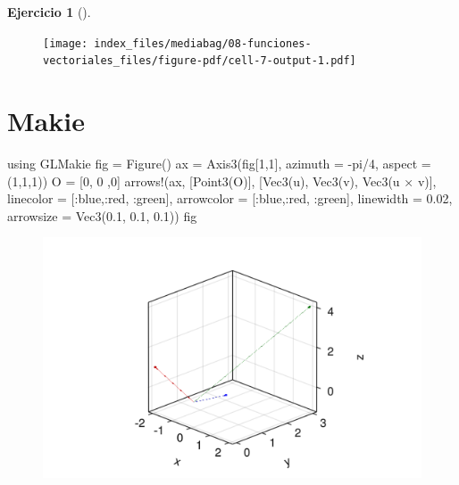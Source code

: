 \documentclass[
  a4paper,
]{scrreport}
\newenvironment{Shaded}{\begin{snugshade}}{\end{snugshade}}
\newcommand{\BuiltInTok}[1]{\textcolor[rgb]{0.00,0.23,0.31}{#1}}
\newcommand{\ConstantTok}[1]{\textcolor[rgb]{0.56,0.35,0.01}{#1}}
\newcommand{\FloatTok}[1]{\textcolor[rgb]{0.68,0.00,0.00}{#1}}
\newcommand{\FunctionTok}[1]{\textcolor[rgb]{0.28,0.35,0.67}{#1}}
\newcommand{\ImportTok}[1]{\textcolor[rgb]{0.00,0.46,0.62}{#1}}
\newcommand{\NormalTok}[1]{\textcolor[rgb]{0.00,0.23,0.31}{#1}}
\newcommand{\OperatorTok}[1]{\textcolor[rgb]{0.37,0.37,0.37}{#1}}
\theoremstyle{definition}
\newtheorem{exercise}{Ejercicio}[chapter]
\theoremstyle{remark}
\begin{document}
\begin{exercise}[]
\begin{enumerate}
\begin{tcolorbox}
  \begin{figure}[H]

  {\centering \texttt{[image: index\_files/mediabag/08-funciones-vectoriales\_files/figure-pdf/cell-7-output-1.pdf]}

  }

  \end{figure}

  \section{Makie}

\begin{Shaded}
\begin{Highlighting}[]
\ImportTok{using} \BuiltInTok{GLMakie}
\NormalTok{fig }\OperatorTok{=} \FunctionTok{Figure}\NormalTok{()}
\NormalTok{ax }\OperatorTok{=} \FunctionTok{Axis3}\NormalTok{(fig[}\FloatTok{1}\NormalTok{,}\FloatTok{1}\NormalTok{], azimuth }\OperatorTok{=} \OperatorTok{{-}}\ConstantTok{pi}\OperatorTok{/}\FloatTok{4}\NormalTok{, aspect }\OperatorTok{=}\NormalTok{ (}\FloatTok{1}\NormalTok{,}\FloatTok{1}\NormalTok{,}\FloatTok{1}\NormalTok{))}
\NormalTok{O }\OperatorTok{=}\NormalTok{ [}\FloatTok{0}\NormalTok{, }\FloatTok{0}\NormalTok{ ,}\FloatTok{0}\NormalTok{]}
\FunctionTok{arrows!}\NormalTok{(ax, [}\FunctionTok{Point3}\NormalTok{(O)], [}\FunctionTok{Vec3}\NormalTok{(u), }\FunctionTok{Vec3}\NormalTok{(v), }\FunctionTok{Vec3}\NormalTok{(u }\OperatorTok{×}\NormalTok{ v)], }
\NormalTok{    linecolor }\OperatorTok{=}\NormalTok{ [}\OperatorTok{:}\NormalTok{blue,}\OperatorTok{:}\NormalTok{red, }\OperatorTok{:}\NormalTok{green], arrowcolor }\OperatorTok{=}\NormalTok{ [}\OperatorTok{:}\NormalTok{blue,}\OperatorTok{:}\NormalTok{red, }\OperatorTok{:}\NormalTok{green],}
\NormalTok{    linewidth }\OperatorTok{=} \FloatTok{0.02}\NormalTok{, arrowsize }\OperatorTok{=} \FunctionTok{Vec3}\NormalTok{(}\FloatTok{0.1}\NormalTok{, }\FloatTok{0.1}\NormalTok{, }\FloatTok{0.1}\NormalTok{))}
\NormalTok{fig}
\end{Highlighting}
\end{Shaded}

  \begin{figure}[H]

  {\centering \includegraphics{08-funciones-vectoriales_files/figure-pdf/cell-8-output-1.png}

}
\end{figure}
\end{tcolorbox}
\end{enumerate}
\end{exercise}
\end{document}
